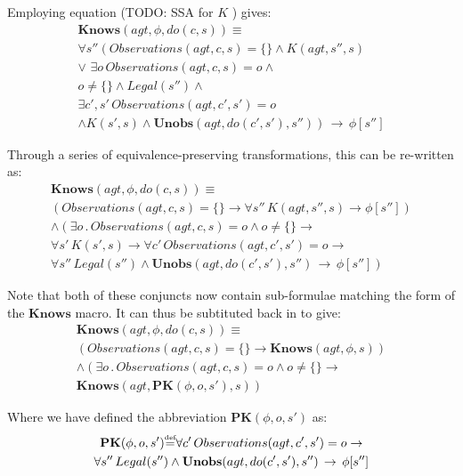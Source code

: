 \documentclass[letterpaper]{article}
\newcommand{\isdef}{\hbox{$\stackrel{\mbox{\tiny def}}{=}$}}
\begin{document}
Employing equation (TODO: SSA for $K$ ) gives:
\begin{multline}
\mathbf{Knows}(agt,\phi,do(c,s))\equiv\\
\forall s''\left(Observations(agt,c,s)=\{\}\wedge K(agt,s'',s)\right.\\
\vee\,\,\exists o\, Observations(agt,c,s)=o\wedge\\
o\neq\{\}\wedge Legal(s'')\wedge\\
\exists c',s'\, Observations(agt,c',s')=o\\
\left.\wedge K(s',s)\wedge\mathbf{Unobs}(agt,do(c',s'),s'')\right)\,\rightarrow\,\phi[s'']
\end{multline}

Through a series of equivalence-preserving transformations, this can be
re-written as:
\begin{multline}
\mathbf{Knows}(agt,\phi,do(c,s))\equiv\\
\left(Observations(agt,c,s)=\{\}\rightarrow\forall s''\, K(agt,s'',s)\rightarrow\phi[s'']\right)\\
\wedge\left(\exists o\,.\,Observations(agt,c,s)=o\wedge o\neq\{\}\rightarrow\right.\\
\forall s'\, K(s',s)\rightarrow \forall c'\, Observations(agt,c',s')=o\rightarrow\\
\left.\forall s''\, Legal(s'')\wedge\mathbf{Unobs}(agt,do(c',s'),s'')\,\rightarrow\,\phi[s'']\right)
\end{multline}

Note that both of these conjuncts now contain sub-formulae matching
the form of the $\mathbf{Knows}$ macro. It can thus be subtituted
back in to give:
\begin{multline}
\mathbf{Knows}(agt,\phi,do(c,s))\equiv\\
\left(Observations(agt,c,s)=\{\}\rightarrow\mathbf{Knows}(agt,\phi,s)\right)\\
\wedge\left(\exists o\,.\,Observations(agt,c,s)=o\wedge o\neq\{\}\rightarrow\right.\\
\left.\mathbf{Knows}(agt,\mathbf{PK}(\phi,o,s'),s)\right)
\end{multline}


Where we have defined the abbreviation $\mathbf{PK}(\phi,o,s')$ as:
\begin{multline}
\mathbf{PK}(\phi,o,s')\isdef\forall c'\, Observations(agt,c',s')=o\rightarrow\\
\forall s''\, Legal(s'')\wedge\mathbf{Unobs}(agt,do(c',s'),s'')\,\rightarrow\,\phi[s'']
\end{multline}
\end{document}
